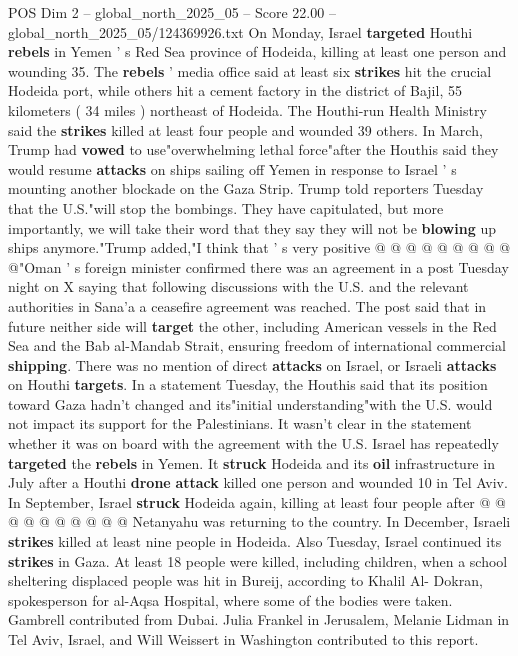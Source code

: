 \begin{textsample}{POS Dim 2 – global\_north\_2025\_05 – Score 22.00 – global\_north\_2025\_05/124369926.txt}
On Monday, Israel \textbf{targeted} Houthi \textbf{rebels} in Yemen ' s Red Sea province of Hodeida, killing at least one person and wounding 35.
The \textbf{rebels} ' media office said at least six \textbf{strikes} hit the crucial Hodeida port, while others hit a cement factory in the district of Bajil, 55 kilometers ( 34 miles ) northeast of Hodeida.
The Houthi-run Health Ministry said the \textbf{strikes} killed at least four people and wounded 39 others.
In March, Trump had \textbf{vowed} to use"overwhelming lethal force"after the Houthis said they would resume \textbf{attacks} on ships sailing off Yemen in response to Israel ' s mounting another blockade on the Gaza Strip.
Trump told reporters Tuesday that the U.S."will stop the bombings.
They have capitulated, but more importantly, we will take their word that they say they will not be \textbf{blowing} up ships anymore."Trump added,"I think that ' s very positive @ @ @ @ @ @ @ @ @ @"Oman ' s foreign minister confirmed there was an agreement in a post Tuesday night on X saying that following discussions with the U.S. and the relevant authorities in Sana'a a ceasefire agreement was reached.
The post said that in future neither side will \textbf{target} the other, including American vessels in the Red Sea and the Bab al-Mandab Strait, ensuring freedom of international commercial \textbf{shipping}.
There was no mention of direct \textbf{attacks} on Israel, or Israeli \textbf{attacks} on Houthi \textbf{targets}.
In a statement Tuesday, the Houthis said that its position toward Gaza hadn't changed and its"initial understanding"with the U.S. would not impact its support for the Palestinians.
It wasn't clear in the statement whether it was on board with the agreement with the U.S.
Israel has repeatedly \textbf{targeted} the \textbf{rebels} in Yemen.
It \textbf{struck} Hodeida and its \textbf{oil} infrastructure in July after a Houthi \textbf{drone} \textbf{attack} killed one person and wounded 10 in Tel Aviv.
In September, Israel \textbf{struck} Hodeida again, killing at least four people after @ @ @ @ @ @ @ @ @ @ Netanyahu was returning to the country.
In December, Israeli \textbf{strikes} killed at least nine people in Hodeida.
Also Tuesday, Israel continued its \textbf{strikes} in Gaza.
At least 18 people were killed, including children, when a school sheltering displaced people was hit in Bureij, according to Khalil Al- Dokran, spokesperson for al-Aqsa Hospital, where some of the bodies were taken.
Gambrell contributed from Dubai.
Julia Frankel in Jerusalem, Melanie Lidman in Tel Aviv, Israel, and Will Weissert in Washington contributed to this report.

\end{textsample}
